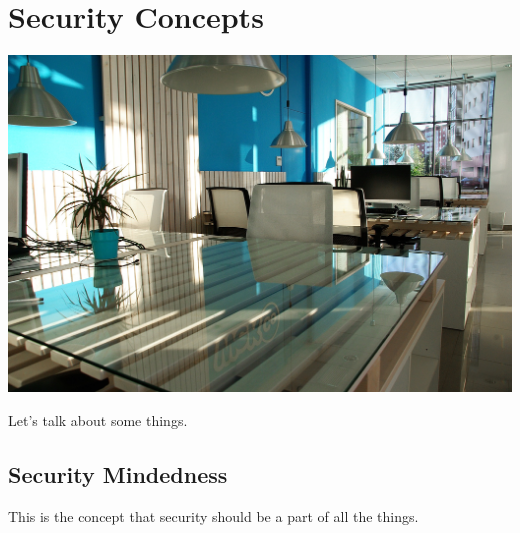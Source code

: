 \chapter{Security Concepts}

\includegraphics[scale=0.85]{../images/office-space-1744803_1920.jpg}

Let's talk about some things.

\section{Security Mindedness}
\justify
This is the concept that security should be a part of all the things. 
